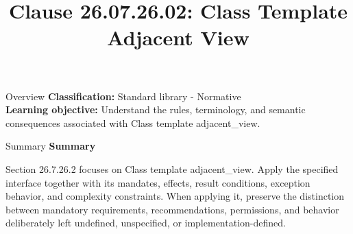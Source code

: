 \documentclass[10pt,letterpaper]{article}
\title{Clause 26.07.26.02: Class Template Adjacent View}
\author{}
\date{}
\begin{document}
\maketitle
\begin{CornellOverviewBox}{Overview}
\textbf{Classification:} Standard library - Normative\\[2pt]
\textbf{Learning objective:} Understand the rules, terminology, and semantic consequences associated with Class template adjacent\_view.
\end{CornellOverviewBox}\begin{CornellSummaryBox}{Summary}
{\sffamily\bfseries\color{Accent} Summary}\par\vspace{3pt}Section 26.7.26.2 focuses on Class template adjacent\_view. Apply the specified interface together with its mandates, effects, result conditions, exception behavior, and complexity constraints. When applying it, preserve the distinction between mandatory requirements, recommendations, permissions, and behavior deliberately left undefined, unspecified, or implementation-defined.
\end{CornellSummaryBox}
\end{document}
